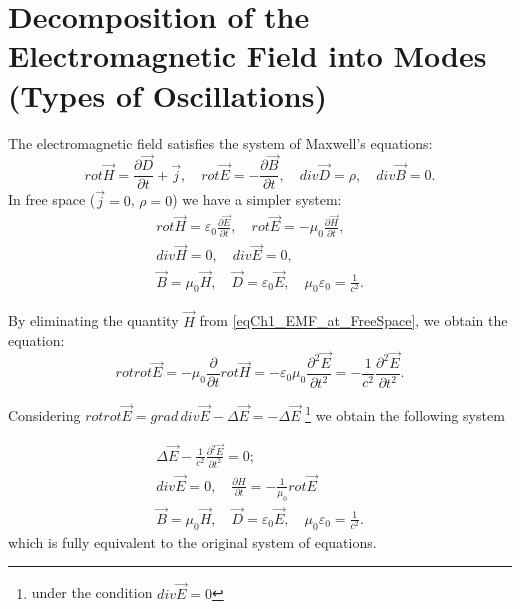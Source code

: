 \section{Decomposition of the Electromagnetic Field into Modes (Types of Oscillations)}
The electromagnetic field satisfies the system of Maxwell's equations:
\begin{equation}
rot \vec{H} = \frac{\partial \vec{D}}{\partial t} + \vec{j}, 
\quad
rot \vec{E} = - \frac{\partial \vec{B}}{\partial t}, 
\quad
div \vec{D} = \rho, \quad
div \vec{B} = 0.
\end{equation}
In free space ($\vec{j} = 0$, $\rho = 0$) we have a simpler system: 
\begin{eqnarray}
rot \vec{H} = \varepsilon_0 \frac{\partial \vec{E}}{\partial t}, 
\quad
rot \vec{E} = - \mu_0 \frac{\partial \vec{H}}{\partial t}, 
\nonumber \\
div \vec{H} = 0,
\quad
div \vec{E} = 0, 
\nonumber \\
\vec{B} = \mu_0 \vec{H}, 
\quad 
\vec{D} = \varepsilon_0 \vec{E}, 
\quad
\mu_0 \varepsilon_0 = \frac{1}{c^2}.
\label{eqCh1_EMF_at_FreeSpace}
\end{eqnarray}

By eliminating the quantity $\vec{H}$ from \eqref{eqCh1_EMF_at_FreeSpace}, we obtain the equation:
\begin{equation}
rot rot \vec{E} = - \mu_0 \frac{\partial}{\partial t} rot \vec{H} = -
\varepsilon_0 \mu_0 \frac{\partial^2 \vec{E}}{\partial t^2} = 
- \frac{1}{c^2} \frac{\partial^2 \vec{E}}{\partial t^2}.
\nonumber
\end{equation}

Considering $rot rot \vec{E} = grad \, div \vec{E} - \Delta \vec{E} = - \Delta
\vec{E}$ \footnote{under the condition $div \vec E = 0$} we obtain the following system

\begin{eqnarray}
\Delta \vec{E} - \frac{1}{c^2} \frac{\partial^2 \vec{E}}{\partial t^2}
= 0;
\nonumber \\
div \vec{E} = 0, 
\quad
\frac{\partial H}{\partial t} = - \frac{1}{\mu_0} rot \vec{E}
\nonumber \\
\vec{B} = \mu_0 \vec{H}, \quad \vec{D} = \varepsilon_0 \vec{E}, \quad \mu_0
\varepsilon_0 = \frac{1}{c^2}.
\label{eqCh1_EMF_at_FreeSpace2}
\end{eqnarray}
which is fully equivalent to the original system of equations. 

